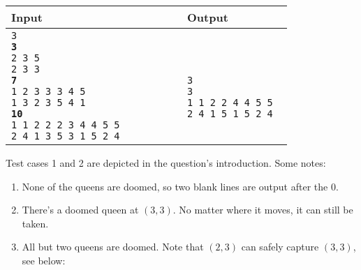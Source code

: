 \begin{table}[h]
    \centering
    \begin{tabular}{|p{0.5\linewidth}|p{0.3\linewidth}|}
        \hline
        Input & Output \\ \hline
        \texttt{3\newline 
        \textbf{3}\newline
        2 3 5\newline
        2 3 3\newline
        \textbf{7}\newline
        1 2 3 3 3 4 5\newline
        1 3 2 3 5 4 1\newline 
        \textbf{10}\newline
        1 1 2 2 2 3 4 4 5 5\newline
        2 4 1 3 5 3 1 5 2 4\newline}
        &
        \texttt{\text{}\newline
        \text{}\newline
        3\newline
        3\newline
        1 1 2 2 4 4 5 5\newline
        2 4 1 5 1 5 2 4\newline}
        \\ \hline
    \end{tabular}
\end{table}

Test cases 1 and 2 are depicted in the question's introduction. Some notes:

\begin{enumerate}
    \item None of the queens are doomed, so two blank lines are output after the 0.
    \item There's a doomed queen at $(3, 3)$.
    No matter where it moves, it can still be taken.
    \item All but two queens are doomed. 
    Note that $(2, 3)$ can safely capture $(3, 3)$, see below:
\end{enumerate}

